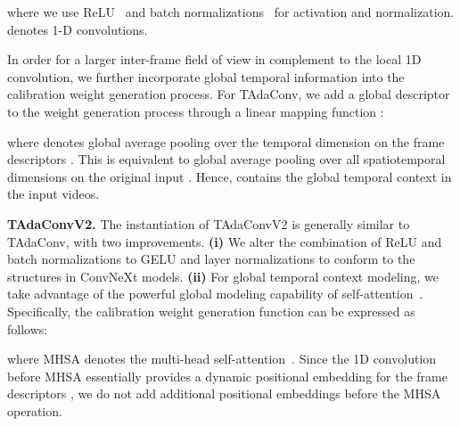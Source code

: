 \documentclass[10pt,journal,compsoc]{IEEEtran}
\begin{document}
\noindent where we use ReLU~\cite{relu} and batch normalizations~\cite{bn} for activation and normalization.  denotes 1-D convolutions. 

In order for a larger inter-frame field of view in complement to the local 1D convolution, we further incorporate global temporal information into the calibration weight generation process. For TAdaConv, we add a global descriptor 
to the weight generation process  through a linear mapping function :

\noindent where  denotes global average pooling over the temporal dimension on the frame descriptors . This is equivalent to global average pooling over all spatiotemporal dimensions on the original input . Hence,  contains the global temporal context in the input videos.

\textbf{TAdaConvV2. }The instantiation of TAdaConvV2 is generally similar to TAdaConv, with two improvements. \textbf{(i)} We alter the combination of ReLU and batch normalizations to GELU and layer normalizations to conform to the structures in ConvNeXt models. \textbf{(ii)} For global temporal context modeling, we take advantage of the powerful global modeling capability of self-attention~\cite{vaswani2017attention}. Specifically, the calibration weight generation function can be expressed as follows:

\noindent where MHSA denotes the multi-head self-attention~\cite{vaswani2017attention}. Since the 1D convolution before MHSA essentially provides a dynamic positional embedding for the frame descriptors , we do not add additional positional embeddings before the MHSA operation. 
\end{document}
